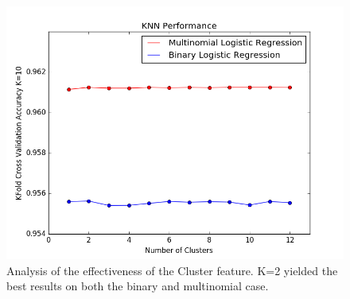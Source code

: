 \documentclass[conference]{IEEEtran}
\begin{document}
\begin{figure}[t]
\centering
        \includegraphics[totalheight=6cm]{cluster-analysis-combined}
    \caption{Analysis of the effectiveness of the Cluster feature. K=2 yielded the best results on both the binary and multinomial case.}
    \label{fig:verticalcell}
\end{figure}
\end{document}
